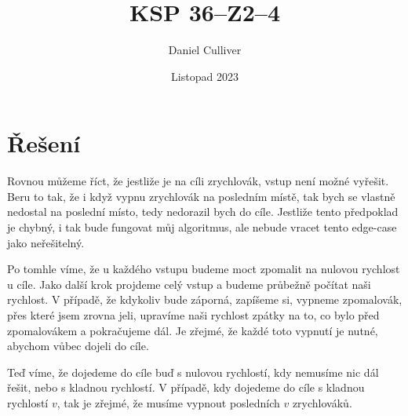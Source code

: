 \documentclass{../../../ksp}
\title{KSP 36--Z2--4}
\author{Daniel Culliver}
\date{Listopad 2023}
\begin{document}
\maketitle

\section*{Řešení}

Rovnou můžeme říct, že jestliže je na cíli zrychlovák, vstup není možné vyřešit.
Beru to tak, že i když vypnu zrychlovák na posledním místě, tak bych se vlastně nedostal na poslední
místo, tedy nedorazil bych do cíle.
Jestliže tento předpoklad je chybný, i tak bude fungovat můj algoritmus, ale nebude vracet tento edge-case
jako neřešitelný.

Po tomhle víme, že u každého vstupu budeme moct zpomalit na nulovou rychlost u cíle.
Jako další krok projdeme celý vstup a budeme průbežně počítat naši rychlost.
V případě, že kdykoliv bude záporná, zapíšeme si, vypneme zpomalovák, přes které jsem zrovna jeli,
upravíme naši rychlost zpátky na to, co bylo před zpomalovákem a pokračujeme dál.
Je zřejmé, že každé toto vypnutí je nutné, abychom vůbec dojeli do cíle.

Teď víme, že dojedeme do cíle buď s nulovou rychlostí, kdy nemusíme nic dál řešit, nebo s kladnou rychlostí.
V případě, kdy dojedeme do cíle s kladnou rychlostí $v$, tak je zřejmé, že musíme vypnout posledních $v$ zrychlováků.
\end{document}

